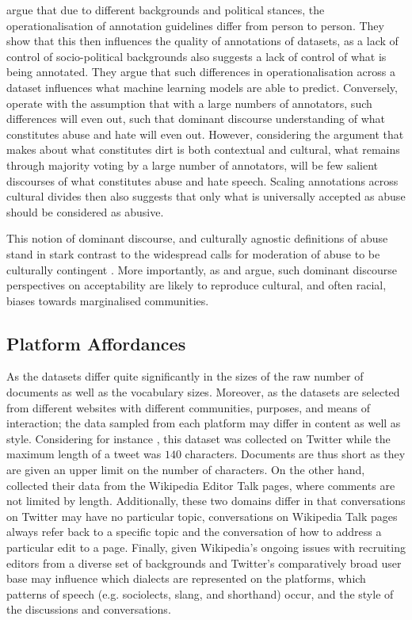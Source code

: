 \citet{Waseem:2016} argue that due to different backgrounds and political stances, the operationalisation of annotation guidelines differ from person to person. They show that this then influences the quality of annotations of datasets, as a lack of control of socio-political backgrounds also suggests a lack of control of what is being annotated. They argue that such differences in operationalisation across a dataset influences what machine learning models are able to predict. Conversely, \citet{Founta:2017} operate with the assumption that with a large numbers of annotators, such differences will even out, such that dominant discourse understanding of what constitutes abuse and hate will even out. However, considering the argument that \citet{Douglas:1966} makes about what constitutes dirt is both contextual and cultural, what remains through majority voting by a large number of annotators, will be few salient discourses of what constitutes abuse and hate speech. Scaling annotations across cultural divides then also suggests that only what is universally accepted as abuse should be considered as abusive.

This notion of dominant discourse, and culturally agnostic definitions of abuse stand in stark contrast to the widespread calls for moderation of abuse to be culturally contingent \cite{CITE: Articles about how content moderation fails}. More importantly, as \citet{Waseem:2017,Davidson:2019} and \citet{Sap:2019} argue, such dominant discourse perspectives on acceptability are likely to reproduce cultural, and often racial, biases towards marginalised communities.


\subsection{Platform Affordances}

As the datasets differ quite significantly in the sizes of the raw number of documents as well as the vocabulary sizes. Moreover, as the datasets are selected from different websites with different communities, purposes, and means of interaction; the data sampled from each platform may differ in content as well as style. Considering for instance \citet{Waseem:2016}, this dataset was collected on Twitter while the maximum length of a tweet was $140$ characters. Documents are thus short as they are given an upper limit on the number of characters. On the other hand, \citet{Wulczyn:2017} collected their data from the Wikipedia Editor Talk pages, where comments are not limited by length. Additionally, these two domains differ in that conversations on Twitter may have no particular topic, conversations on Wikipedia Talk pages always refer back to a specific topic and the conversation of how to address a particular edit to a page. Finally, given Wikipedia's ongoing issues with recruiting editors from a diverse set of backgrounds \cite{CITE: Wikipedia editors issue} and Twitter's comparatively broad user base \cite{CITE: Twitter userbase by demographic ref} may influence which dialects are represented on the platforms, which patterns of speech (e.g. sociolects, slang, and shorthand) occur, and the style of the discussions and conversations.

